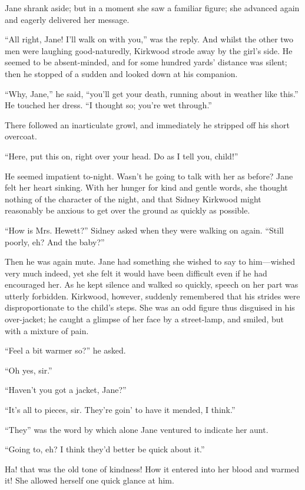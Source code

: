 Jane shrank aside; but in a moment she {\protect\hypertarget{30}{}{}}saw
a familiar figure; she advanced again and eagerly delivered her message.

``All right, Jane! I'll walk on with you,'' was the reply. And whilst
the other two men were laughing good-naturedly, Kirkwood strode away by
the girl's side. He seemed to be absent-minded, and for some hundred
yards' distance was silent; then he stopped of a sudden and looked down
at his companion.

``Why, Jane,'' he said, ``you'll get your death, running about in
weather like this.'' He touched her dress. ``I thought so; you're wet
through.''

There followed an inarticulate growl, and immediately he stripped off
his short overcoat.

``Here, put this on, right over your head. Do as I tell you, child!''

He seemed impatient to-night. Wasn't he going to talk with her as
before? Jane felt her heart sinking. With her hunger for kind and gentle
words, she thought nothing of the character of the night, and that
Sidney Kirkwood might reasonably be anxious to get over the ground as
quickly as possible.

{\protect\hypertarget{31}{}{}}``How is Mrs. Hewett?'' Sidney asked when
they were walking on again. ``Still poorly, eh? And the baby?''

Then he was again mute. Jane had something she wished to say to
him---wished very much indeed, yet she felt it would have been difficult
even if he had encouraged her. As he kept silence and walked so quickly,
speech on her part was utterly forbidden. Kirkwood, however, suddenly
remembered that his strides were disproportionate to the child's steps.
She was an odd figure thus disguised in his over-jacket; he caught a
glimpse of her face by a street-lamp, and smiled, but with a mixture of
pain.

``Feel a bit warmer so?'' he asked.

``Oh yes, sir.''

``Haven't you got a jacket, Jane?''

``It's all to pieces, sir. They're goin' to have it mended, I think.''

``They'' was the word by which alone Jane ventured to indicate her aunt.

``Going to, eh? I think they'd better be quick about it.''

{\protect\hypertarget{32}{}{}}Ha! that was the old tone of kindness! How
it entered into her blood and warmed it! She allowed herself one quick
glance at him.

